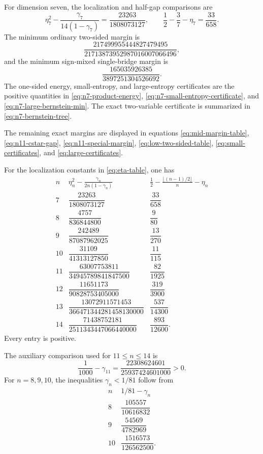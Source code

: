 \documentclass[11pt,a4paper]{article}
\numberwithin{equation}{section}
\theoremstyle{definition}
\newcommand{\1}{\mathbf{1}}
\begin{document}
For dimension seven, the localization and half-gap comparisons are
\begin{equation}\label{eq:app-n7-localization}
 \eta_7^2-\frac{\gamma_7}{14(1-\gamma_7)}
 =\frac{23263}{1808073127},
 \qquad
 \frac12-\frac37-\eta_7=\frac{33}{658}.
\end{equation}
The minimum ordinary two-sided margin is
\[
 \frac{217499955444827479495}
 {21713873952987016007066496},
\]
and the minimum sign-mixed single-bridge margin is
\[
 \frac{165035926385}{3897251304526692}.
\]
The one-sided energy, small-entropy, and large-entropy certificates are the
positive quantities in \eqref{eq:n7-product-energy},
\eqref{eq:n7-small-entropy-certificate}, and
\eqref{eq:n7-large-bernstein-min}.  The exact two-variable certificate is
summarized in \eqref{eq:n7-bernstein-tree}.

The remaining exact margins are displayed in equations
\eqref{eq:mid-margin-table}, \eqref{eq:n11-cstar-gap},
\eqref{eq:n11-special-margin}, \eqref{eq:low-two-sided-table},
\eqref{eq:small-certificates}, and \eqref{eq:large-certificates}.

For the localization constants in \eqref{eq:eta-table}, one has
\begin{equation}\label{eq:localization-certificates}
\begin{array}{c|c|c}
 n&\displaystyle
 \eta_n^2-\frac{\gamma_n}{2n(1-\gamma_n)}
 &\displaystyle
 \frac12-\frac{\lfloor(n-1)/2\rfloor}{n}-\eta_n\\ \hline
 7&\dfrac{23263}{1808073127}&\dfrac{33}{658}\\[3mm]
 8&\dfrac{4757}{836844800}&\dfrac9{80}\\[3mm]
 9&\dfrac{242489}{87087962025}&\dfrac{13}{270}\\[3mm]
 10&\dfrac{31109}{41313127850}&\dfrac{11}{115}\\[3mm]
 11&\dfrac{63007753811}{34945789841847500}&\dfrac{82}{1925}\\[3mm]
 12&\dfrac{11651173}{90828753405000}&\dfrac{319}{3900}\\[3mm]
 13&\dfrac{13072911571453}{366471344281458130000}&\dfrac{537}{14300}\\[3mm]
 14&\dfrac{71438752181}{2511343447066440000}&\dfrac{893}{12600}.
\end{array}
\end{equation}
Every entry is positive.

The auxiliary comparison used for $11\le n\le14$ is
\begin{equation}\label{eq:gamma11-small}
 \frac1{1000}-\gamma_{11}
 =\frac{22308624601}{25937424601000}>0.
\end{equation}
For $n=8,9,10$, the inequalities $\gamma_n<1/81$ follow from
\begin{equation}\label{eq:gamma-low-small}
\begin{array}{c|c}
 n&1/81-\gamma_n\\ \hline
 8&\dfrac{105557}{10616832}\\[2mm]
 9&\dfrac{54569}{4782969}\\[2mm]
 10&\dfrac{1516573}{126562500}.
\end{array}
\end{equation}
\end{document}
